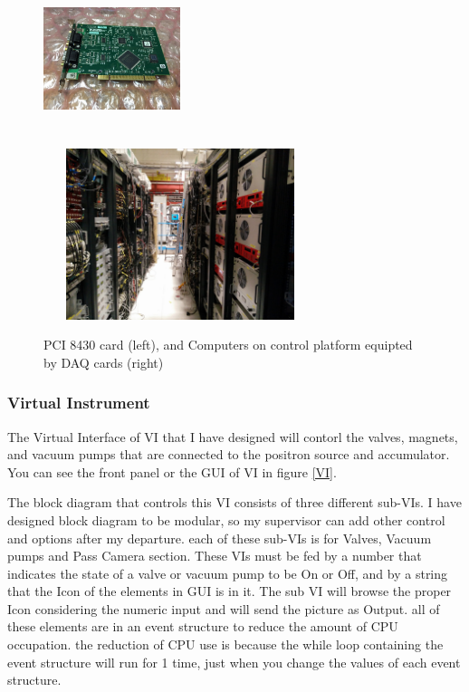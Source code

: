 \documentclass[12pt,a4paper]{article}
\begin{document}
\begin{figure}[h]
\centering
\includegraphics[width=40mm, height=50mm]{PCI_8430}
\includegraphics[width=80mm, height=50mm]{control_platform}
\caption{PCI 8430 card (left), and Computers on control platform equipted by DAQ cards (right) }
\end{figure}
	
\subsubsection{Virtual Instrument}

The Virtual Interface of VI that I have designed will contorl the valves, magnets, and vacuum pumps that are connected to the positron source and accumulator. You can see the front panel or the GUI of VI in figure \ref{VI}. 

The block diagram that controls this VI consists of three different sub-VIs. I have designed  block diagram to be modular, so my supervisor can add other control and options after my departure. each of these sub-VIs is for Valves, Vacuum pumps and Pass Camera section. These VIs must be fed by a number that indicates the state of a valve or vacuum pump to be On or Off, and by a string that the Icon of the elements in GUI is in it. The sub VI will browse the proper Icon considering the numeric input and will send the picture as Output. all of these elements are in an event structure to reduce the amount of CPU occupation. the reduction of CPU use is because the while loop containing the event structure will run for 1 time, just when you change the values of each event structure.
\end{document}
